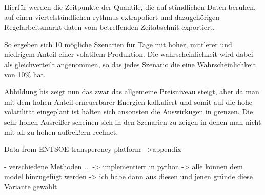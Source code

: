 Hierfür werden die Zeitpunkte der Quantile, die auf stündlichen Daten beruhen, auf einen viertelstündlichen rythmus extrapoliert und
dazugehörigen Regelarbeitsmarkt daten vom betreffenden Zeitabschnit exportiert.

So ergeben sich 10 mögliche Szenarien für Tage mit hoher, mittlerer und niedrigem Anteil einer volatilem Produktion. Die wahrscheinlichkeit
wird dabei als gleichverteilt angenommen, so das jedes Szenario die eine Wahrscheinlichkeit von 10\% hat.

Abbildung   bis
zeigt nun das zwar das allgemeine Preisniveau steigt, aber da man mit dem hohen Anteil erneuerbarer Energien
kalkuliert und somit auf die hohe volatilität eingeplant ist halten sich ansonsten die Auswirkugen in grenzen.
Die sehr hohen Ausreißer scheinen sich in den Szenarien zu zeigen in denen man nicht mit all zu hohen außreißern rechnet.



Data from ENTSOE transperency platform
-->appendix




- verschiedene Methoden ...
-> implementiert in python
-> alle können dem model hinzugefügt werden
-> ich habe dann aus diesen und jenen gründe diese Variante gewählt

